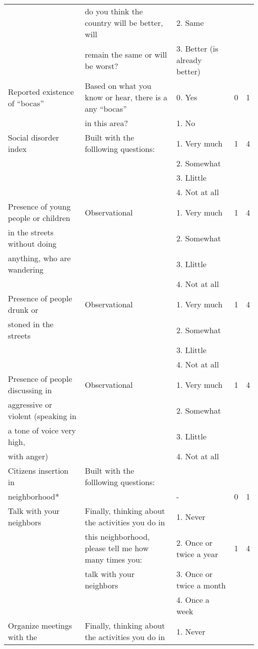 \begin{table}[htbp]
\begin{tiny}
\begin{tabular}{lllcc}
	&	 do you think the country will be better, will 	&	2. Same	&		&		\\
	&	remain the same or will be worst?	&	3. Better (is already better)	&		&		\\\hline
Reported existence of ``bocas'' &	Based on what you know or hear, there is a any ``bocas'' &	0. Yes	&	0	&	1	\\
	&	in this area?	&	1. No 	&		&		\\\hline
Social disorder index	&	Built with the folllowing questions:	&	1. Very much	&	1	&	4	\\
	&		&	2. Somewhat	&		&		\\
	&		&	3. Llittle	&		&		\\
	&		&	4. Not at all	&		&		\\
Presence of young people or children 	&	Observational	&	1. Very much	&	1	&	4	\\
in the streets without doing	&		&	2. Somewhat	&		&		\\
 anything, who are wandering	&		&	3. Llittle	&		&		\\
	&		&	4. Not at all	&		&		\\
Presence of   people drunk or 	&	Observational	&	1. Very much	&	1	&	4	\\
stoned in the streets	&		&	2. Somewhat	&		&		\\
	&		&	3. Llittle	&		&		\\
	&		&	4. Not at all	&		&		\\
Presence of people discussing in 	&	Observational	&	1. Very much	&	1	&	4	\\
aggressive or violent (speaking in 	&		&	2. Somewhat	&		&		\\
a tone of voice very high, 	&		&	3. Llittle	&		&		\\
with anger)	&		&	4. Not at all	&		&		\\\hline
Citizens insertion in 	&	Built with the folllowing questions:	&		&		&		\\
neighborhood*	&		&	-	&	0	&	1	\\
Talk with your neighbors	&	Finally, thinking about the activities you do in 	&	1. Never	&		&		\\
	&	this neighborhood, please tell me how many times you:	&	2. Once or twice a year	&	1	&	4	\\
	&	talk with your neighbors	&	3. Once or twice a month	&		&		\\
	&		&	4. Once a week	&		&		\\
Organize meetings with the 	&	Finally, thinking about the activities you do in 	&	1. Never	&		&		\\

\end{tabular}
\end{tiny}
\end{table}
